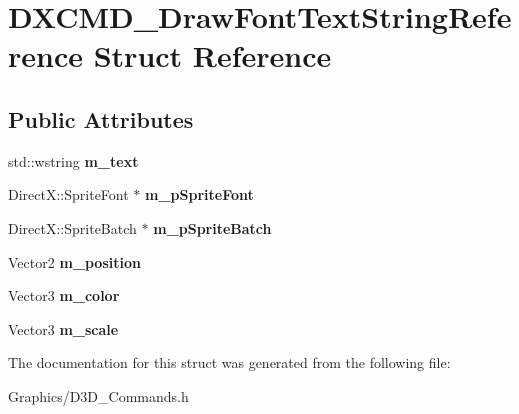 \hypertarget{structDXCMD__DrawFontTextStringReference}{}\section{D\+X\+C\+M\+D\+\_\+\+Draw\+Font\+Text\+String\+Reference Struct Reference}
\label{structDXCMD__DrawFontTextStringReference}
\subsection*{Public Attributes}
\begin{DoxyCompactItemize}
\item 
\mbox{\label{structDXCMD__DrawFontTextStringReference_ac95c2c7ab96a865bbd41950f7cafbdf1}} 
std\+::wstring {\bfseries m\+\_\+text}
\item 
\mbox{\label{structDXCMD__DrawFontTextStringReference_a579e5dafd8ec18ff173d194bcda96765}} 
Direct\+X\+::\+Sprite\+Font $\ast$ {\bfseries m\+\_\+p\+Sprite\+Font}
\item 
\mbox{\label{structDXCMD__DrawFontTextStringReference_ae055e78433edbde5286223089d2f319f}} 
Direct\+X\+::\+Sprite\+Batch $\ast$ {\bfseries m\+\_\+p\+Sprite\+Batch}
\item 
\mbox{\label{structDXCMD__DrawFontTextStringReference_a115a962bcb9e30a88fe614f8948b7d87}} 
Vector2 {\bfseries m\+\_\+position}
\item 
\mbox{\label{structDXCMD__DrawFontTextStringReference_a4146273c68bbb3fcaac7f240d966f258}} 
Vector3 {\bfseries m\+\_\+color}
\item 
\mbox{\label{structDXCMD__DrawFontTextStringReference_a64676107e10defe187dd436c5fc63fb6}} 
Vector3 {\bfseries m\+\_\+scale}
\end{DoxyCompactItemize}


The documentation for this struct was generated from the following file\+:\begin{DoxyCompactItemize}
\item 
Graphics/D3\+D\+\_\+\+Commands.\+h\end{DoxyCompactItemize}
